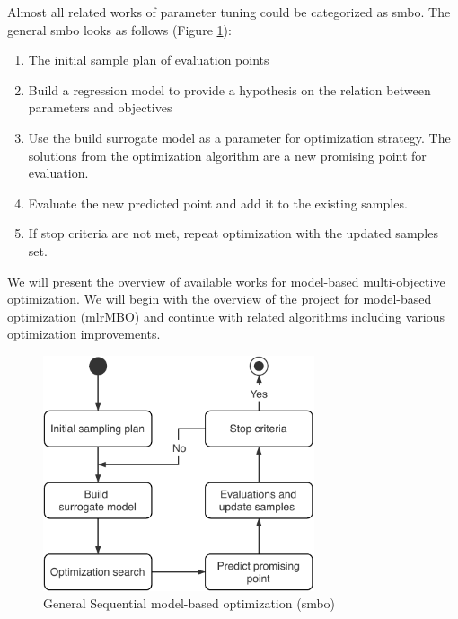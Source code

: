         Almost all related works of parameter tuning could be categorized as \gls{smbo}\cite{JonesSW98}.
        The general \gls{smbo} looks as follows (Figure \ref{fig:sequential_mbo}):
        \begin{enumerate}
            \item The initial sample plan of evaluation points
            \item Build a regression model to provide a hypothesis on the relation between parameters and objectives
            \item Use the build surrogate model as a parameter for optimization strategy. The solutions from the optimization algorithm are a new promising point for evaluation.
            \item Evaluate the new predicted point and add it to the existing samples.
            \item If stop criteria are not met, repeat optimization with the updated samples set.
        \end{enumerate}
        We will present the overview of available works for model-based multi-objective optimization. We will begin with the overview of the project for model-based optimization (mlrMBO) and continue with related algorithms including various optimization improvements.

        \begin{figure}
            \centering 
            \includegraphics[width=8cm]{content/images/utility/sequential_mbo}
            \caption[General Sequential model-based optimization]{General Sequential model-based optimization (\Gls{smbo})} 
            \label{fig:sequential_mbo} 
        \end{figure}

